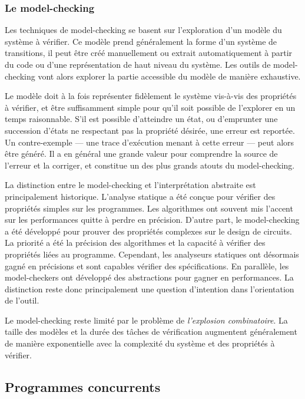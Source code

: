 \subsubsection{Le model-checking}

Les techniques de model-checking se basent sur l'exploration d'un modèle du
système à vérifier. Ce modèle prend généralement la forme d'un système de
transitions, il peut être créé manuellement ou extrait automatiquement à partir
du code ou d'une représentation de haut niveau du système. Les outils de
model-checking vont alors explorer la partie accessible du modèle de manière
exhaustive.

Le modèle doit à la fois représenter fidèlement le système vis-à-vis des
propriétés à vérifier, et être suffisamment simple pour qu'il soit
possible de l'explorer en un temps raisonnable. S’il est possible
d'atteindre un état, ou d'emprunter une succession d'états ne respectant
pas la propriété désirée, une erreur est reportée. Un contre-exemple ---
une trace d'exécution menant à cette erreur --- peut alors être généré.
Il a en général une grande valeur pour comprendre la source de l'erreur
et la corriger, et constitue un des plus grands atouts du model-checking.

La distinction entre le model-checking et l'interprétation abstraite est
principalement historique. L'analyse statique a été conçue pour vérifier
des propriétés simples sur les programmes. Les algorithmes ont souvent
mis l'accent sur les performances quitte à perdre en précision. D'autre
part, le model-checking a été développé pour prouver des propriétés
complexes sur le design de circuits. La priorité a été la précision des
algorithmes et la capacité à vérifier des propriétés liées au
programme. Cependant, les analyseurs statiques ont désormais gagné en
précisions et sont capables vérifier des spécifications. En parallèle, les
model-checkers ont développé des abstractions pour gagner en
performances. La distinction reste donc principalement une question
d'intention dans l'orientation de l'outil.

Le model-checking reste limité par le problème de \emph{l'explosion
combinatoire}. La taille des modèles et la durée des tâches de
vérification augmentent généralement de manière exponentielle avec la
complexité du système et des propriétés à vérifier.

\subsection{Programmes concurrents}

